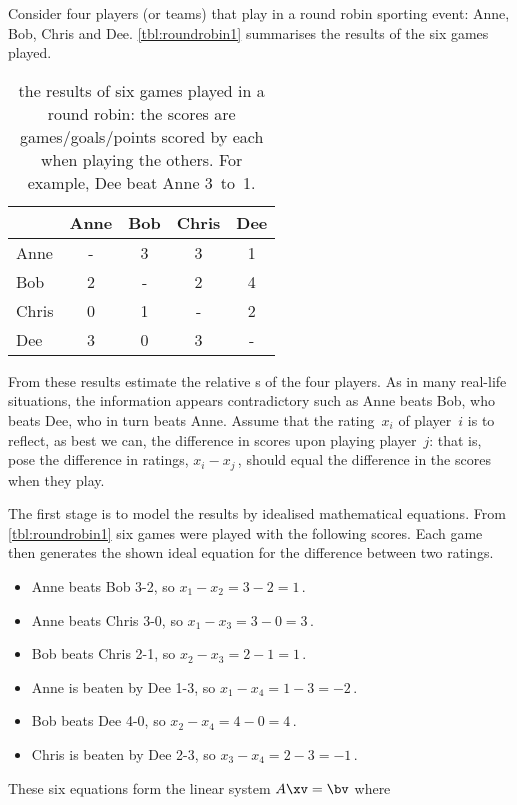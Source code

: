 \begin{example} \label{eg:roundrobin1}
Consider four players (or teams) that play in a round robin sporting event: Anne, Bob, Chris and Dee.
\autoref{tbl:roundrobin1} summarises the results of the six games played.
\begin{table}
\caption{the results of six games played in a round robin: the scores are games\slash goals\slash points scored by each when playing the others.  For example, Dee beat Anne 3~to~1.}
\label{tbl:roundrobin1}
\begin{center}
\begin{tabular}{l|cccc} \hline
&Anne& Bob& Chris& Dee\\ \hline
Anne & - & 3 & 3 & 1 \\
Bob & 2 & - & 2 & 4 \\
Chris & 0 & 1 & - & 2 \\
Dee & 3 & 0 & 3 & - \\ \hline
\end{tabular}
\end{center}
\end{table}%
From these results estimate the relative s of the four players.
As in many real-life situations, the information appears contradictory such as Anne beats Bob, who beats Dee, who in turn beats Anne.
Assume that the rating~\(x_i\) of player~\(i\) is to reflect, as best we can, the difference in scores upon playing player~\(j\):  that is, pose the difference in ratings, \(x_i-x_j\)\,, should equal the difference in the scores when they play.
\begin{solution} 
The first stage is to model the results by idealised mathematical equations.
From \autoref{tbl:roundrobin1} six games were played with the following scores.  
Each game then generates the shown ideal equation for the difference between two ratings.
\begin{itemize}
\item Anne beats Bob 3-2, so \(x_1-x_2=3-2=1\)\,.
\item Anne beats Chris 3-0, so \(x_1-x_3=3-0=3\)\,.
\item Bob beats Chris 2-1, so \(x_2-x_3=2-1=1\)\,.
\item Anne is beaten by Dee 1-3, so \(x_1-x_4=1-3=-2\)\,.
\item Bob beats Dee 4-0, so \(x_2-x_4=4-0=4\)\,.
\item Chris is beaten by Dee 2-3, so \(x_3-x_4=2-3=-1\)\,.
\end{itemize}
These six equations form the linear system \(A\xv=\bv\) where

\end{solution}
\end{example}
